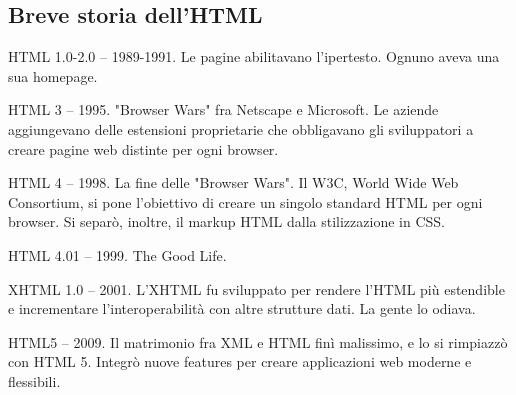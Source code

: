    \subsection{Breve storia dell'HTML}
    
        HTML 1.0-2.0 -- 1989-1991. Le pagine abilitavano l'ipertesto. Ognuno aveva una sua homepage.
        
        HTML 3 -- 1995. "Browser Wars" fra Netscape e Microsoft. Le aziende aggiungevano delle estensioni proprietarie che obbligavano gli sviluppatori a creare pagine web distinte per ogni browser.
        
        HTML 4 -- 1998. La fine delle "Browser Wars". Il W3C, World Wide Web Consortium, si pone l'obiettivo di creare un singolo standard HTML per ogni browser. Si separò, inoltre, il markup HTML dalla stilizzazione in CSS.
        
        HTML 4.01 -- 1999. The Good Life.
        
        XHTML 1.0 -- 2001. L'XHTML fu sviluppato per rendere l'HTML più estendible e incrementare l'interoperabilità con altre strutture dati. La gente lo odiava.
        
        HTML5 -- 2009. Il matrimonio fra XML e HTML finì malissimo, e lo si rimpiazzò con HTML 5. Integrò nuove features per creare applicazioni web moderne e flessibili.